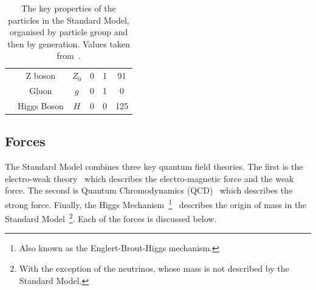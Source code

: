 {\begin{table}[!ht]
\begin{center}
\begin{tabular}{|c|c||c|c|c|c|}
                            &Z boson          &   $Z_0$       &  0      &  1     &  91\\
                            &Gluon            &   $g$         &  0      &  1     &  0 \\
                            &Higgs Boson      &   $H$         &  0      &  0     &  125\\
    \hline  
    \end{tabular} 
  \caption[The key properties of the particles in the Standard Model]
          {The key properties of the particles in the Standard Model, organised by particle group and then by generation.
            Values taken from~\cite{obj-bjets_PDG}.}
  \label{tab:theo-sm_particles}
  \end{center}
  \end{table}}

  \newpage
\subsection{Forces}
\label{sec:theo-sm_forces}

The Standard Model combines three key quantum field theories.
The first is the electro-weak theory~\cite{theo-glashow}
which describes the electro-magnetic force and the weak force.
The second is Quantum Chromodynamics (QCD)~\cite{obj-bjets_PDG} which describes the strong force.
Finally, the Higgs Mechanism~\footnote{Also known as the Englert-Brout-Higgs mechanism.}~\cite{theo-higgs,theo-be}
describes the origin of mass in the Standard Model~\footnote{With the exception of the neutrinos, whose mass is not described by the Standard Model.}.
Each of the forces is discussed below.

